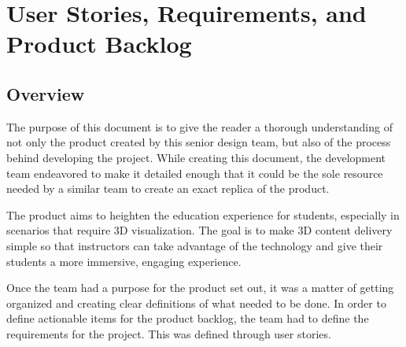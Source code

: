 
\chapter{User Stories,  Requirements, and Product Backlog}



\section{Overview}


The purpose of this document is to give the reader a thorough understanding of
not only the product created by this senior design team, but also of the
process behind developing the project.
While creating this document, the development team endeavored to make it detailed enough that it could be the sole resource needed by a similar team to create an exact replica of the product.

The product aims to heighten the education experience for
students, especially in scenarios that require 3D visualization. The goal is to
make 3D content delivery simple so that instructors can take advantage of the
technology and give their students a more immersive, engaging experience.

Once the team had a purpose for the product set out, it was a matter of getting
organized and creating clear definitions of what needed to be done.
In order to define actionable items for the product backlog, the team had to define
the requirements for the project. This was defined through user stories.




